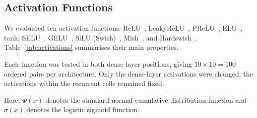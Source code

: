 \documentclass[conference,a4paper]{IEEEtran}
\begin{document}
\subsection{Activation Functions}

We evaluated ten activation functions:
ReLU~\cite{nair2010},
LeakyReLU~\cite{maas2013},
PReLU~\cite{he2015},
ELU~\cite{clevert2015},
tanh,
SELU~\cite{klambauer2017},
GELU~\cite{hendrycks2016},
SiLU (Swish)~\cite{ramachandran2017},
Mish~\cite{misra2020}, and
Hardswish~\cite{howard2019}.
Table~\ref{tab:activations} summarises their main properties.

Each function was tested in both dense-layer positions,
giving $10\times10=100$ ordered pairs per architecture.
Only the dense-layer activations were changed; the
activations within the recurrent cells remained fixed.

\begin{table}[htbp]
  \caption{Activation Functions and Key Properties}
  \label{tab:activations}
  \centering
  \footnotesize
  \setlength{\tabcolsep}{3pt}
  \renewcommand{\arraystretch}{1.05}
\end{table}

Here, $\Phi(x)$ denotes the standard normal cumulative
distribution function and $\sigma(x)$ denotes the
logistic sigmoid function.
\end{document}
